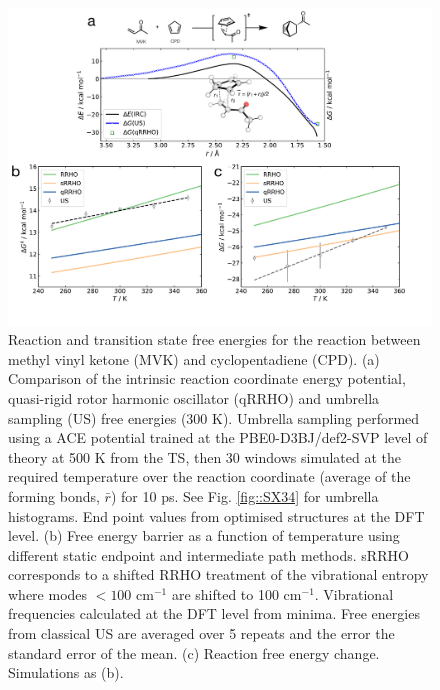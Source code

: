 \documentclass[twoside,twocolumn,9pt]{article}
\begin{document}
\begin{figure}[b]
	\centering
	\includegraphics[width=13.1cm]{figX3}
	\caption{Reaction and transition state free energies for the reaction between methyl vinyl ketone (MVK) and cyclopentadiene (CPD). (a) Comparison of the intrinsic reaction coordinate energy potential, quasi-rigid rotor harmonic oscillator (qRRHO) and umbrella sampling (US) free energies (300 K). Umbrella sampling performed using a ACE potential trained at the PBE0-D3BJ/def2-SVP level of theory at 500 K from the TS, then 30 windows simulated at the required temperature over the reaction coordinate (average of the forming bonds, $\bar{r}$) for 10 ps. See Fig. \ref{fig::SX34} for umbrella histograms. End point values from optimised structures at the DFT level. (b) Free energy barrier as a function of temperature using different static endpoint and intermediate path methods. sRRHO corresponds to a shifted RRHO treatment of the vibrational entropy where modes $<100$ cm$^{-1}$ are shifted to 100 cm$^{-1}$. Vibrational frequencies calculated at the DFT level from minima. Free energies from classical US are averaged over 5 repeats and the error the standard error of the mean. (c) Reaction free energy change. Simulations as (b).}
	\label{fig::X3}
\end{figure}
\end{document}
